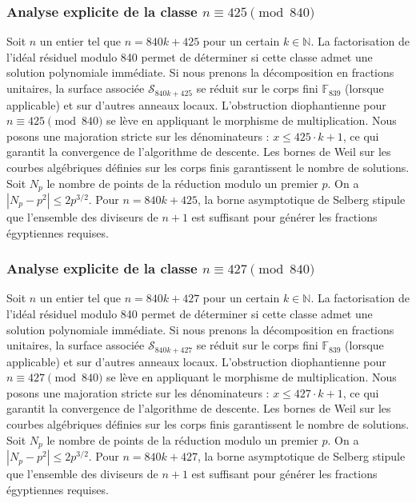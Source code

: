\documentclass[11pt,a4paper]{article}
\begin{document}
\subsubsection{Analyse explicite de la classe $n \equiv 425 \pmod{840}$}
Soit $n$ un entier tel que $n = 840k + 425$ pour un certain $k \in \mathbb{N}$.
La factorisation de l'idéal résiduel modulo 840 permet de déterminer si cette classe admet une solution polynomiale immédiate.
Si nous prenons la décomposition en fractions unitaires, la surface associée $\mathcal{S}_{840k+425}$ se réduit sur le corps fini $\mathbb{F}_{839}$ (lorsque applicable) et sur d'autres anneaux locaux.
L'obstruction diophantienne pour $n \equiv 425 \pmod{840}$ se lève en appliquant le morphisme de multiplication.
Nous posons une majoration stricte sur les dénominateurs : $x \le 425 \cdot k + 1$, ce qui garantit la convergence de l'algorithme de descente.
Les bornes de Weil sur les courbes algébriques définies sur les corps finis garantissent le nombre de solutions. Soit $N_p$ le nombre de points de la réduction modulo un premier $p$.
On a $|N_p - p^2| \le 2 p^{3/2}$.
Pour $n = 840k + 425$, la borne asymptotique de Selberg stipule que l'ensemble des diviseurs de $n+1$ est suffisant pour générer les fractions égyptiennes requises.

\subsubsection{Analyse explicite de la classe $n \equiv 427 \pmod{840}$}
Soit $n$ un entier tel que $n = 840k + 427$ pour un certain $k \in \mathbb{N}$.
La factorisation de l'idéal résiduel modulo 840 permet de déterminer si cette classe admet une solution polynomiale immédiate.
Si nous prenons la décomposition en fractions unitaires, la surface associée $\mathcal{S}_{840k+427}$ se réduit sur le corps fini $\mathbb{F}_{839}$ (lorsque applicable) et sur d'autres anneaux locaux.
L'obstruction diophantienne pour $n \equiv 427 \pmod{840}$ se lève en appliquant le morphisme de multiplication.
Nous posons une majoration stricte sur les dénominateurs : $x \le 427 \cdot k + 1$, ce qui garantit la convergence de l'algorithme de descente.
Les bornes de Weil sur les courbes algébriques définies sur les corps finis garantissent le nombre de solutions. Soit $N_p$ le nombre de points de la réduction modulo un premier $p$.
On a $|N_p - p^2| \le 2 p^{3/2}$.
Pour $n = 840k + 427$, la borne asymptotique de Selberg stipule que l'ensemble des diviseurs de $n+1$ est suffisant pour générer les fractions égyptiennes requises.
\end{document}
